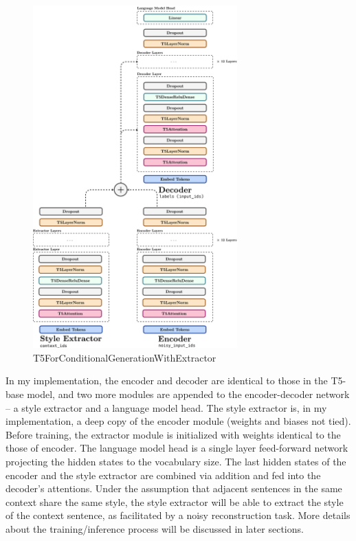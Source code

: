 \documentclass[a4paper]{article}
\begin{document}
\begin{figure}[H]
    \centering
    \includegraphics[width=0.7\textwidth]{model_df.pdf}
    \caption{T5ForConditionalGenerationWithExtractor}
    \label{fig:T5ForConditionalGenerationWithExtractor}
\end{figure}

In my implementation, the encoder and decoder are identical to those in the T5-base model, and two more modules are appended to the encoder-decoder network -- a style extractor and a language model head. The style extractor is, in my implementation, a deep copy of the encoder module (weights and biases not tied). Before training, the extractor module is initialized with weights identical to the those of encoder. The language model head is a single layer feed-forward network projecting the hidden states to the vocabulary size. The last hidden states of the encoder and the style extractor are combined via addition and fed into the decoder's attentions. Under the assumption that adjacent sentences in the same context share the same style, the style extractor will be able to extract the style of the context sentence, as facilitated by a noisy reconstruction task. More details about the training/inference process will be discussed in later sections.
\end{document}
